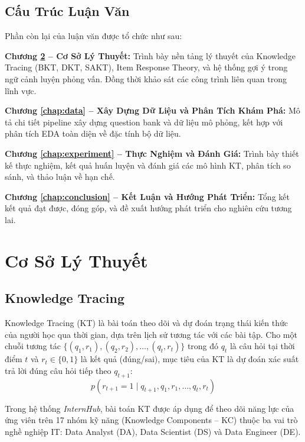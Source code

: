 \documentclass[12pt, a4paper]{report}
\newcommand{\system}{\textit{InternHub}}
\begin{document}
\section{Cấu Trúc Luận Văn}
\label{sec:structure}

Phần còn lại của luận văn được tổ chức như sau:

\textbf{Chương \ref{chap:theory} -- Cơ Sở Lý Thuyết:} Trình bày nền tảng lý thuyết của Knowledge Tracing (BKT, DKT, SAKT), Item Response Theory, và hệ thống gợi ý trong ngữ cảnh luyện phỏng vấn. Đồng thời khảo sát các công trình liên quan trong lĩnh vực.

\textbf{Chương \ref{chap:data} -- Xây Dựng Dữ Liệu và Phân Tích Khám Phá:} Mô tả chi tiết pipeline xây dựng question bank và dữ liệu mô phỏng, kết hợp với phân tích EDA toàn diện về đặc tính bộ dữ liệu.

\textbf{Chương \ref{chap:experiment} -- Thực Nghiệm và Đánh Giá:} Trình bày thiết kế thực nghiệm, kết quả huấn luyện và đánh giá các mô hình KT, phân tích so sánh, và thảo luận về hạn chế.

\textbf{Chương \ref{chap:conclusion} -- Kết Luận và Hướng Phát Triển:} Tổng kết kết quả đạt được, đóng góp, và đề xuất hướng phát triển cho nghiên cứu tương lai.

\chapter{Cơ Sở Lý Thuyết}
\label{chap:theory}

\section{Knowledge Tracing}
\label{sec:kt}

Knowledge Tracing (KT) là bài toán theo dõi và dự đoán trạng thái kiến thức của người học qua thời gian, dựa trên lịch sử tương tác với các bài tập. Cho một chuỗi tương tác $\{(q_1, r_1), (q_2, r_2), \ldots, (q_t, r_t)\}$ trong đó $q_t$ là câu hỏi tại thời điểm $t$ và $r_t \in \{0, 1\}$ là kết quả (đúng/sai), mục tiêu của KT là dự đoán xác suất trả lời đúng câu hỏi tiếp theo $q_{t+1}$:
\begin{equation}
  p(r_{t+1} = 1 \mid q_{t+1}, q_1, r_1, \ldots, q_t, r_t)
\end{equation}

Trong hệ thống \system{}, bài toán KT được áp dụng để theo dõi năng lực của ứng viên trên 17 nhóm kỹ năng (Knowledge Components -- KC) thuộc ba vai trò nghề nghiệp IT: Data Analyst (DA), Data Scientist (DS) và Data Engineer (DE).
\end{document}
